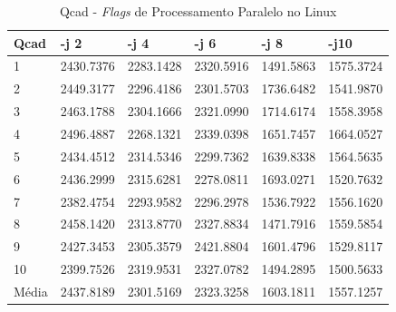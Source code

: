 \begin{apendicesenv}
\begin{table}[!ht]
\centering
\tiny
\caption{Qcad - \textit{Flags} de Processamento Paralelo no Linux}
\label{tab:flag_processamento_paralelo:linux:qcad}
\begin{tabular}{llllll}
\textbf{Qcad} & \textbf{-j 2} & \textbf{-j 4} & \textbf{-j 6} & \textbf{-j 8} & \textbf{-j10}  \\ \toprule
1         & 2430.7376 &   2283.1428  &  2320.5916  &  1491.5863 &   1575.3724     \\ 
2         & 2449.3177 &   2296.4186  &  2301.5703  &  1736.6482 &   1541.9870     \\ 
3         & 2463.1788 &   2304.1666  &  2321.0990  &  1714.6174 &   1558.3958     \\ 
4         & 2496.4887 &   2268.1321  &  2339.0398  &  1651.7457 &   1664.0527     \\ 
5         & 2434.4512 &   2314.5346  &  2299.7362  &  1639.8338 &   1564.5635     \\ 
6         & 2436.2999 &   2315.6281  &  2278.0811  &  1693.0271 &   1520.7632     \\ 
7         & 2382.4754 &   2293.9582  &  2296.2978  &  1536.7922 &   1556.1620     \\ 
8         & 2458.1420 &   2313.8770  &  2327.8834  &  1471.7916 &   1559.5854     \\ 
9         & 2427.3453 &   2305.3579  &  2421.8804  &  1601.4796 &   1529.8117     \\ 
10        & 2399.7526 &   2319.9531  &  2327.0782  &  1494.2895 &   1500.5633     \\ \bottomrule
Média     & 2437.8189 &   2301.5169  &  2323.3258  &  1603.1811 &   1557.1257     \\ 
\end{tabular}
\end{table}



\end{apendicesenv}
